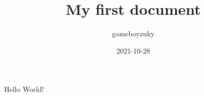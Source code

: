 \documentclass{article}
\title{My first document}
\date{2021-10-28}
\author{gameboyzuky}
\begin{document}
\maketitle
\newpage
{}
Hello World!
\end{document}

